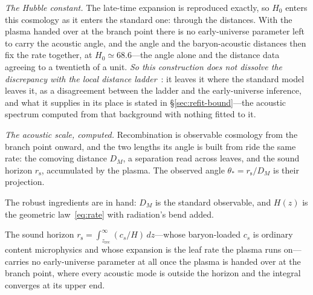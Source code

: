 \documentclass[11pt,a4paper]{article}
\theoremstyle{plain}
\theoremstyle{definition}
\theoremstyle{remark}
\newcommand{\rs}{r_{\mathrm{s}}}
\begin{document}
\emph{The Hubble constant.} The late-time expansion is reproduced exactly, so $H_0$ enters this cosmology as it enters the standard one: through the distances. With the plasma handed over at the branch point there is no early-universe parameter left to carry the acoustic angle, and the angle and the baryon-acoustic distances then fix the rate together, at $H_0\simeq68.6$---the angle alone and the distance data agreeing to a twentieth of a unit. \emph{So this construction does not dissolve the discrepancy with the local distance ladder}~\cite{Riess2022}: it leaves it where the standard model leaves it, as a disagreement between the ladder and the early-universe inference, and what it supplies in its place is stated in \S\ref{sec:refit-bound}---the acoustic spectrum computed from that background with nothing fitted to it.

\emph{The acoustic scale, computed.} Recombination is observable cosmology from the branch point onward, and the two lengths its angle is built from ride the same rate: the comoving distance $D_M$, a separation read across leaves, and the sound horizon $\rs$, accumulated by the plasma. The observed angle $\theta_*=\rs/D_M$ is their projection. 

The robust ingredients are in hand: $D_M$ is the standard observable, and $H(z)$ is the geometric law~\eqref{eq:rate} with radiation's bend added. 

The sound horizon $\rs=\int_{z_{\mathrm{rec}}}^{\infty}(c_s/H)\,dz$---whose baryon-loaded $c_s$ is ordinary content microphysics and whose expansion is the leaf rate the plasma runs on---carries no early-universe parameter at all once the plasma is handed over at the branch point, where every acoustic mode is outside the horizon and the integral converges at its upper end.
\end{document}
